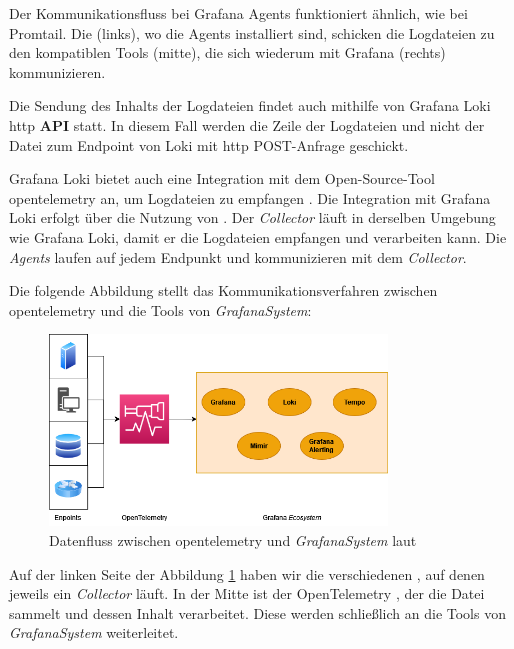 Der Kommunikationsfluss bei Grafana Agents funktioniert ähnlich, wie bei Promtail. Die  (links), wo die Agents installiert sind, schicken die Logdateien zu den kompatiblen Tools (mitte), die sich wiederum mit Grafana (rechts) kommunizieren.

Die Sendung des Inhalts der Logdateien findet auch mithilfe von Grafana Loki \gls{http} \textbf{\gls{API}} statt. In diesem Fall werden die Zeile der Logdateien und nicht der Datei zum \gls{Endpoint} von Loki mit \gls{http} POST-Anfrage geschickt.

Grafana Loki bietet auch eine Integration mit dem Open-Source-Tool \gls{opentelemetry} an, um Logdateien zu empfangen \citep{Grafana_opentelemetry}. Die Integration mit Grafana Loki erfolgt über die Nutzung von . Der \textit{Collector} läuft in derselben Umgebung wie Grafana Loki, damit er die Logdateien empfangen und verarbeiten kann. Die \textit{Agents} laufen auf jedem Endpunkt und kommunizieren mit dem \textit{Collector}.

\newpage
Die folgende Abbildung stellt das Kommunikationsverfahren zwischen \gls{opentelemetry} und die Tools von \textit{\gls{GrafanaSystem}}:

\begin{figure}[H]
   \centering
   \includegraphics[width=0.8\textwidth]{assets/OpenTelemtry.png}
   \caption[Datenfluss zwischen \gls{opentelemetry} und die Tools von \textit{\gls{GrafanaSystem}}]
   {Datenfluss zwischen \gls{opentelemetry} und \textit{\gls{GrafanaSystem}} laut \cite{Grafana_WhatOpentelemetry}}
   \label{fig:UsingOpenTelemetry}
   \centering
\end{figure}


Auf der linken Seite der Abbildung \ref{fig:UsingOpenTelemetry} haben wir die verschiedenen , auf denen jeweils ein \textit{Collector} läuft. In der Mitte ist der OpenTelemetry , der die Datei sammelt und dessen Inhalt verarbeitet. Diese werden schließlich an die Tools von \textit{\gls{GrafanaSystem}} weiterleitet.

